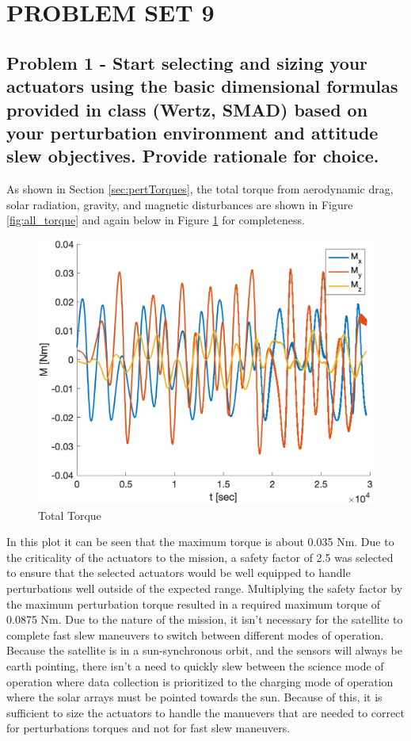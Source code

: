 \section{\Large PROBLEM SET 9}

\subsection{Problem 1 - Start selecting and sizing your actuators using the basic dimensional formulas provided in class (Wertz, SMAD) based on your perturbation environment and attitude slew objectives. Provide rationale for choice.}

As shown in Section \ref{sec:pertTorques}, the total torque from aerodynamic drag, solar radiation, gravity, and magnetic disturbances are shown in Figure \ref{fig:all_torque} and again below in Figure \ref{fig:all_torque_hw9} for completeness.

\begin{figure}[H]
    \centering
    \captionsetup{ justification = centering }
    \includegraphics[width = 12cm]{Images/PS6/all_torque.png}
    \caption{Total Torque}
    \label{fig:all_torque_hw9}
\end{figure}

In this plot it can be seen that the maximum torque is about 0.035 Nm. Due to the criticality of the actuators to the mission, a safety factor of 2.5 was selected to ensure that the selected actuators would be well equipped to handle perturbations well outside of the expected range. Multiplying the safety factor by the maximum perturbation torque resulted in a required maximum torque of 0.0875 Nm. Due to the nature of the mission, it isn't necessary for the satellite to complete fast slew maneuvers to switch between different modes of operation. Because the satellite is in a sun-synchronous orbit, and the sensors will always be earth pointing, there isn't a need to quickly slew between the science mode of operation where data collection is prioritized to the charging mode of operation where the solar arrays must be pointed towards the sun. Because of this, it is sufficient to size the actuators to handle the manuevers that are needed to correct for perturbations torques and not for fast slew maneuvers.

